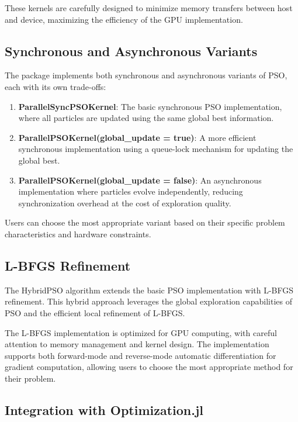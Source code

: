 These kernels are carefully designed to minimize memory transfers between host and device, maximizing the efficiency of the GPU implementation.

\subsection{Synchronous and Asynchronous Variants}

The package implements both synchronous and asynchronous variants of PSO, each with its own trade-offs:

\begin{enumerate}
\item \textbf{ParallelSyncPSOKernel}: The basic synchronous PSO implementation, where all particles are updated using the same global best information.

\item \textbf{ParallelPSOKernel(global\_update = true)}: A more efficient synchronous implementation using a queue-lock mechanism for updating the global best.

\item \textbf{ParallelPSOKernel(global\_update = false)}: An asynchronous implementation where particles evolve independently, reducing synchronization overhead at the cost of exploration quality.
\end{enumerate}

Users can choose the most appropriate variant based on their specific problem characteristics and hardware constraints.

\subsection{L-BFGS Refinement}

The HybridPSO algorithm extends the basic PSO implementation with L-BFGS refinement. This hybrid approach leverages the global exploration capabilities of PSO and the efficient local refinement of L-BFGS.

The L-BFGS implementation is optimized for GPU computing, with careful attention to memory management and kernel design. The implementation supports both forward-mode and reverse-mode automatic differentiation for gradient computation, allowing users to choose the most appropriate method for their problem.

\subsection{Integration with Optimization.jl}

